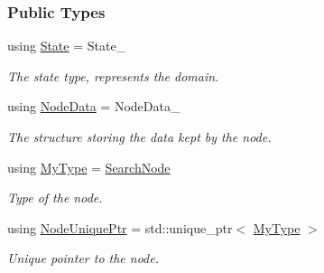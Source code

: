 \subsubsection*{Public Types}
\begin{DoxyCompactItemize}
\item 
using \hyperlink{structslb_1_1core_1_1sb_1_1SearchNode_a1ddf004be6dc181034b39283698985ac}{State} = State\+\_\+\hypertarget{structslb_1_1core_1_1sb_1_1SearchNode_a1ddf004be6dc181034b39283698985ac}{}\label{structslb_1_1core_1_1sb_1_1SearchNode_a1ddf004be6dc181034b39283698985ac}

\begin{DoxyCompactList}\small\item\em The state type, represents the domain. \end{DoxyCompactList}\item 
using \hyperlink{structslb_1_1core_1_1sb_1_1SearchNode_a94388d3bada09043aa13733629f0b1d5}{Node\+Data} = Node\+Data\+\_\+\hypertarget{structslb_1_1core_1_1sb_1_1SearchNode_a94388d3bada09043aa13733629f0b1d5}{}\label{structslb_1_1core_1_1sb_1_1SearchNode_a94388d3bada09043aa13733629f0b1d5}

\begin{DoxyCompactList}\small\item\em The structure storing the data kept by the node. \end{DoxyCompactList}\item 
using \hyperlink{structslb_1_1core_1_1sb_1_1SearchNode_ae2ea0008cdc50ebc06102fcd9e5f29d2}{My\+Type} = \hyperlink{structslb_1_1core_1_1sb_1_1SearchNode}{Search\+Node}\hypertarget{structslb_1_1core_1_1sb_1_1SearchNode_ae2ea0008cdc50ebc06102fcd9e5f29d2}{}\label{structslb_1_1core_1_1sb_1_1SearchNode_ae2ea0008cdc50ebc06102fcd9e5f29d2}

\begin{DoxyCompactList}\small\item\em Type of the node. \end{DoxyCompactList}\item 
using \hyperlink{structslb_1_1core_1_1sb_1_1SearchNode_a67cdbbbe4aecada5a1f554b4580d228c}{Node\+Unique\+Ptr} = std\+::unique\+\_\+ptr$<$ \hyperlink{structslb_1_1core_1_1sb_1_1SearchNode_ae2ea0008cdc50ebc06102fcd9e5f29d2}{My\+Type} $>$\hypertarget{structslb_1_1core_1_1sb_1_1SearchNode_a67cdbbbe4aecada5a1f554b4580d228c}{}\label{structslb_1_1core_1_1sb_1_1SearchNode_a67cdbbbe4aecada5a1f554b4580d228c}

\begin{DoxyCompactList}\small\item\em Unique pointer to the node. \end{DoxyCompactList}\end{DoxyCompactItemize}
